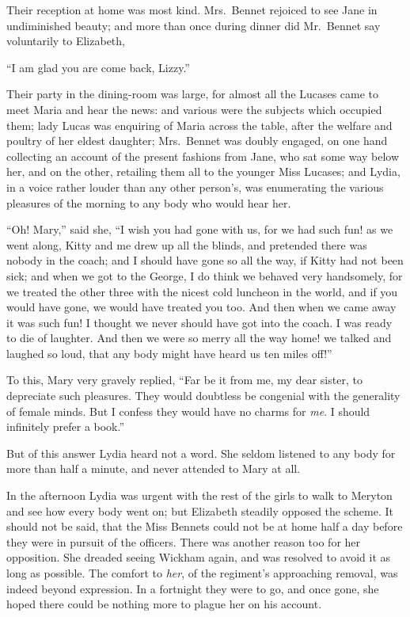 Their reception at home was most kind. Mrs.\ Bennet
rejoiced to see Jane in undiminished bea\-uty; and more
than once during dinner did Mr.\ Bennet say voluntarily
to Elizabeth,

“I am glad you are come back, Lizzy.”

Their party in the dining-room was large, for almost
all the Lucases came to meet Maria and hear the news:
and various were the subjects which occupied them;
lady Lucas was enquiring of Maria across the table, after
the welfare and poultry of her eldest daughter; Mrs.\ Bennet
was doubly engaged, on one hand collecting an account
of the present fashions from Jane, who sat some way
below her, and on the other, retailing them all to the
younger Miss Lucases; and Lydia, in a voice rather
louder than any other person’s, was enumerating the
various pleasures of the morning to any body who would
hear her.

“Oh! Mary,” said she, “I wish you had gone with
us, for we had such fun! as we went along, Kitty and
me drew up all the blinds, and pretended there was
nobody in the coach; and I should have gone so all the
way, if Kitty had not been sick; and when we got to
the George, I do think we behaved very handsomely, for
we treated the other three with the nicest cold luncheon
in the world, and if you would have gone, we would have
treated you too. And then when we came away it was
such fun! I thought we never should have got into the
coach. I was ready to die of laughter. And then we were
so merry all the way home! we talked and laughed so
loud, that any body might have heard us ten miles off!”

To this, Mary very gravely replied, “Far be it from
me, my dear sister, to depreciate such pleasures. They
would doubtless be congenial with the generality of female
minds. But I confess they would have no charms for \textit{me}.
I should infinitely prefer a book.”

But of this answer Lydia heard not a word. She seldom
listened to any body for more than half a minute, and
never attended to Mary at all.

In the afternoon Lydia was urgent with the rest of the
girls to walk to Meryton and see how every body went on;
but Elizabeth steadily opposed the scheme. It should
not be said, that the Miss Bennets could not be at home
half a day before they were in pursuit of the officers.
There was another reason too for her opposition. She
dreaded seeing Wickham again, and was resolved to avoid
it as long as possible. The comfort to \textit{her}, of the regiment’s
approaching removal, was indeed beyond expression. In
a fortnight they were to go, and once gone, she hoped
there could be nothing more to plague her on his account.

